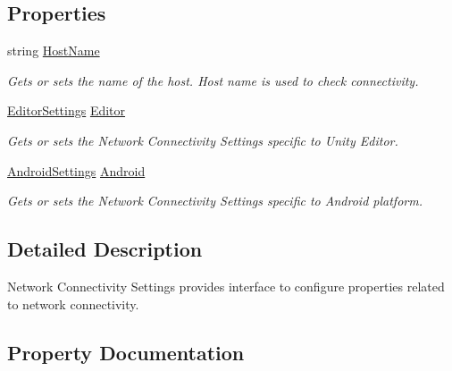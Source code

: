 \subsection*{Properties}
\begin{DoxyCompactItemize}
\item 
string \hyperlink{class_voxel_busters_1_1_native_plugins_1_1_network_connectivity_settings_a6c401471a0edef2db0eef984406c3ae3}{Host\+Name}
\begin{DoxyCompactList}\small\item\em Gets or sets the name of the host. Host name is used to check connectivity. \end{DoxyCompactList}\item 
\hyperlink{class_voxel_busters_1_1_native_plugins_1_1_network_connectivity_settings_1_1_editor_settings}{Editor\+Settings} \hyperlink{class_voxel_busters_1_1_native_plugins_1_1_network_connectivity_settings_a5af8c9ccc82421a7a5d8b12e79870ff9}{Editor}
\begin{DoxyCompactList}\small\item\em Gets or sets the Network Connectivity Settings specific to Unity Editor. \end{DoxyCompactList}\item 
\hyperlink{class_voxel_busters_1_1_native_plugins_1_1_network_connectivity_settings_1_1_android_settings}{Android\+Settings} \hyperlink{class_voxel_busters_1_1_native_plugins_1_1_network_connectivity_settings_a1c2d6ed884eda0a6f3e7bb4913332b0a}{Android}
\begin{DoxyCompactList}\small\item\em Gets or sets the Network Connectivity Settings specific to Android platform. \end{DoxyCompactList}\end{DoxyCompactItemize}


\subsection{Detailed Description}
Network Connectivity Settings provides interface to configure properties related to network connectivity. 



\subsection{Property Documentation}
\hypertarget{class_voxel_busters_1_1_native_plugins_1_1_network_connectivity_settings_a6c401471a0edef2db0eef984406c3ae3}{}
